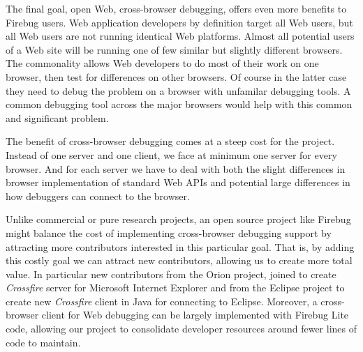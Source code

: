The final goal, open Web, cross-browser debugging, offers even more benefits to
Firebug users.  Web application developers by definition target all Web users,
but all Web users are not running identical Web platforms. Almost all
potential users of a Web site will be running one of few similar but slightly
different browsers. The commonality allows Web developers to do most of their
work on one browser, then test for differences on other browsers. Of course in
the latter case they need to debug the problem on a browser with unfamilar debugging
tools. A common debugging tool across the major browsers would help with this
common and significant problem.

The benefit of cross-browser debugging comes at a steep cost for the project.
Instead of one server and one client, we face at minimum one server for every
browser. And for each server we have to deal with both the slight differences in
browser implementation of standard Web APIs and potential large differences in
how debuggers can connect to the browser.

Unlike commercial or pure research projects, an open source project like Firebug
might balance the cost of
implementing cross-browser debugging support by attracting more contributors
interested in this particular goal. That is, by adding this costly goal we can
attract new contributors, allowing us to create more total value. In particular
new contributors from the Orion project\cite{orion}, joined to create
\textit{Crossfire} server for Microsoft Internet Explorer and from the Eclipse
project\cite{EclipseJSDT} to create new \textit{Crossfire} client in Java for
connecting to Eclipse.   Moreover, a cross-browser client for Web debugging can be largely
implemented with Firebug Lite code, allowing our project to consolidate
developer resources around fewer lines of code to maintain.

